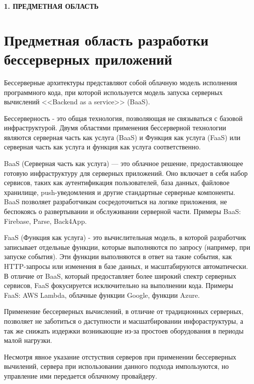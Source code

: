 \newpage
\begin{center}
  \textbf{\large 1. ПРЕДМЕТНАЯ ОБЛАСТЬ}
\end{center}

\section{Предметная область разработки бессерверных приложений}

Бессерверные архитектуры представляют собой облачную модель исполнения программного кода, при которой используется модель запуска серверных вычислений <<Backend as a service>> (BaaS). \cite{roberts2017serverless}

Бессерверность - это общая технология, позволяющая не связываться с базовой инфраструктурой. Двумя областями применения бессерверной технологии являются серверная часть как услуга (BaaS) и Функция как услуга (FaaS) или серверная часть как услуга и функция как услуга соответственно. 

BaaS (Серверная часть как услуга) — это облачное решение, предоставляющее готовую инфраструктуру для серверных приложений. Оно включает в себя набор сервисов, таких как аутентификация пользователей, база данных, файловое хранилище, push-уведомления и другие стандартные серверные компоненты. BaaS позволяет разработчикам сосредоточиться на логике приложения, не беспокоясь о развертывании и обслуживании серверной части. Примеры BaaS: Firebase, Parse, Back4App.

FaaS (Функция как услуга) - это вычислительная модель, в которой разработчик записывает отдельные функции, которые выполняются по запросу (например, при запуске события). Эти функции выполняются в ответ на такие события, как HTTP-запросы или изменения в базе данных, и масштабируются автоматически. В отличие от BaaS, который предоставляет более широкий спектр серверных сервисов, FaaS фокусируется исключительно на выполнении кода. Примеры FaaS: AWS Lambda, облачные функции Google, функции Azure.\cite{elsten2023exploring}

Применение бессерверных вычислений, в отличие от традиционных серверных, позволяет не заботиться о даступности и масшатбировании инфораструктуры, а так же снижать издержки возникающие из-за простоев оборудования в периоды малой нагрузки.\cite{pu2019shuffling}

Несмотря явное указание отстуствия серверов при применении бессерверных вычилений, сервера при использовании данного подхода импользуются, но управление ими передается облачному провайдеру.

